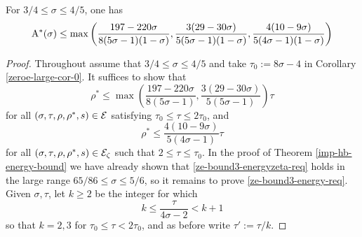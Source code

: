 \begin{theorem}\label{imp-energy-bound3}
    For $3/4 \le \sigma \le 4/5$, one has
    \[
    \mathrm{A}^*(\sigma) \le \max\left(\frac{197 - 220\sigma}{8(5\sigma - 1)(1 - \sigma)}, \frac{3(29 - 30\sigma)}{5(5\sigma - 1)(1 - \sigma)}, \frac{4(10 - 9\sigma)}{5(4\sigma - 1)(1 - \sigma)}\right)
    \]
\end{theorem}

\derived
{}

\begin{proof}
Throughout assume that $3/4 \le \sigma \le 4/5$ and take $\tau_0 := 8\sigma - 4$ in Corollary \ref{zeroe-large-cor-0}. It suffices to show that
\begin{equation}\label{ze-bound3-energy-req}
\rho^* \le \max\left(\frac{197 - 220\sigma}{8(5\sigma - 1)}, \frac{3(29 - 30\sigma)}{5(5\sigma - 1)}\right)\tau
\end{equation}
for all $(\sigma, \tau, \rho, \rho^*, s) \in \mathcal{E}$ satisfying $\tau_0 \le \tau \le 2\tau_0$, and
\begin{equation}\label{ze-bound3-energyzeta-req}
\rho^* \le \frac{4(10 - 9\sigma)}{5(4\sigma - 1)}\tau
\end{equation}
for all $(\sigma, \tau, \rho, \rho^*, s) \in \mathcal{E}_\zeta$ such that $2 \le \tau \le \tau_0$.
In the proof of Theorem \ref{imp-hb-energy-bound} we have already shown that \eqref{ze-bound3-energyzeta-req} holds in the large range $65/86 \le \sigma \le 5/6$, so it remains to prove \eqref{ze-bound3-energy-req}. Given $\sigma, \tau$, let $k \ge 2$ be the integer for which
\begin{equation}
\label{ze-bound3-kdefn}
k \le \frac{\tau}{4\sigma - 2} < k + 1
\end{equation}
so that $k = 2, 3$ for $\tau_0 \le \tau < 2\tau_0$, and as before write $\tau' := \tau/k$.


\end{proof}
